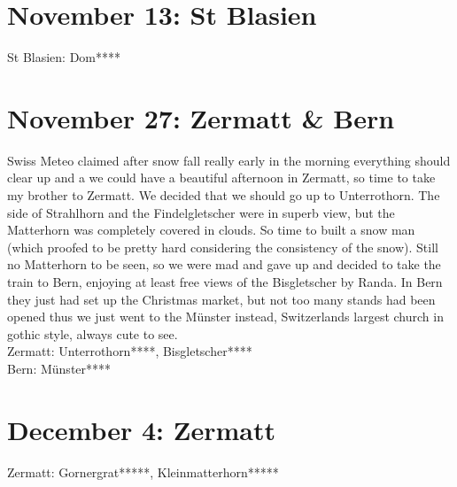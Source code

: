 \section{November 13: St Blasien}
\label{2010StBlasien}

St Blasien: Dom****

\section{November 27: Zermatt \& Bern}
\label{2010ZermattBern}

Swiss Meteo claimed after snow fall really early in the morning everything should clear up and a we could have a beautiful afternoon in Zermatt, so time to take my brother to Zermatt. We decided that we should go up to Unterrothorn. The side of Strahlhorn and the Findelgletscher were in superb view, but the Matterhorn was completely covered in clouds. So time to built a snow man (which proofed to be pretty hard considering the consistency of the snow). Still no Matterhorn to be seen, so we were mad and gave up and decided to take the train to Bern, enjoying at least free views of the Bisgletscher by Randa. In Bern they just had set up the Christmas market, but not too many stands had been opened thus we just went to the M\"unster instead, Switzerlands largest church in gothic style, always cute to see.\\

Zermatt: Unterrothorn****, Bisgletscher****\\
Bern: M\"unster****

\section{December 4: Zermatt}
\label{2010ZermattII}

Zermatt: Gornergrat*****, Kleinmatterhorn*****